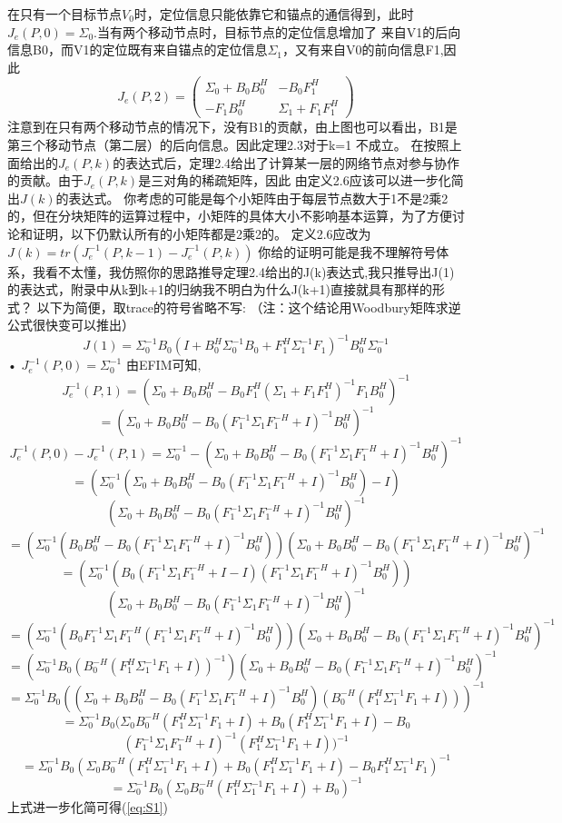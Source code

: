 \documentclass[12pt]{article}
\begin{document}
在只有一个目标节点$V_0$时，定位信息只能依靠它和锚点的通信得到，此时
$J_e(P,0)=\Sigma_0$.当有两个移动节点时，目标节点的定位信息增加了
来自V1的后向信息B0，而V1的定位既有来自锚点的定位信息$\Sigma_1$，又有来自V0的前向信息F1,因此
\[
J_e(P,2)=\left(
\begin{array}{cc}
\Sigma_0+B_0 B_0^H & -B_0 F_1^H\\
-F_1 B_0^H & \Sigma_1+F_1 F_1^H
\end{array}
\right)
\]
注意到在只有两个移动节点的情况下，没有B1的贡献，由上图也可以看出，B1是第三个移动节点（第二层）的后向信息。因此定理2.3对于k=1
不成立。
在按照上面给出的$J_e(P,k)$的表达式后，定理2.4给出了计算某一层的网络节点对参与协作的贡献。由于$J_e(P,k)$是三对角的稀疏矩阵，因此
由定义2.6应该可以进一步化简出$J(k)$的表达式。
你考虑的可能是每个小矩阵由于每层节点数大于1不是2乘2的，但在分块矩阵的运算过程中，小矩阵的具体大小不影响基本运算，为了方便讨论和证明，以下仍默认所有的小矩阵都是2乘2的。
定义2.6应改为$J(k)=tr(J^{-1}_e(P,k-1)-J^{-1}_e(P,k))$
你给的证明可能是我不理解符号体系，我看不太懂，我仿照你的思路推导定理2.4给出的J(k)表达式,我只推导出J(1)的表达式，附录中从k到k+1的归纳我不明白为什么J(k+1)直接就具有那样的形式？
以下为简便，取trace的符号省略不写:
（注：这个结论用Woodbury矩阵求逆公式很快变可以推出）
\begin{equation}\label{eq:S1}
J(1)=\Sigma_0^{-1} B_0 (I+B_0^H \Sigma_0^{-1} B_0+F_1^H \Sigma_1^{-1} F_1 )^{-1} B_0^H \Sigma_0^{-1}
\end{equation}•
$J_e^{-1}(P,0)=\Sigma_0^{-1}$
由EFIM可知,
\[
J_e^{-1}(P,1)=(\Sigma_0+B_0B_0^H-B_0F_1^H(\Sigma_1+F_1F_1^H)^{-1}F_1B_0^H)^{-1}
\]
\[
=(\Sigma_0+B_0B_0^H-B_0(F_1^{-1}\Sigma_1F_1^{-H}+I)^{-1}B_0^H)^{-1}
\]
\[
J_e^{-1}(P,0)-J_e^{-1}(P,1)
=\Sigma_0^{-1}-(\Sigma_0+B_0B_0^H-B_0(F_1^{-1}\Sigma_1F_1^{-H}+I)^{-1}B_0^H)^{-1}
\]
\[
=(\Sigma_0^{-1}(\Sigma_0+B_0B_0^H-B_0(F_1^{-1}\Sigma_1F_1^{-H}+I)^{-1}B_0^H)-I)
\]
\[
(\Sigma_0+B_0B_0^H-B_0(F_1^{-1}\Sigma_1F_1^{-H}+I)^{-1}B_0^H)^{-1}
\]
\[
=(\Sigma_0^{-1}(B_0B_0^H-B_0(F_1^{-1}\Sigma_1F_1^{-H}+I)^{-1}B_0^H))(\Sigma_0+B_0B_0^H-B_0(F_1^{-1}\Sigma_1F_1^{-H}+I)^{-1}B_0^H)^{-1}
\]
\[
=(\Sigma_0^{-1}(B_0(F_1^{-1}\Sigma_1F_1^{-H}+I-I)(F_1^{-1}\Sigma_1F_1^{-H}+I)^{-1}B_0^H))
\]
\[
(\Sigma_0+B_0B_0^H-B_0(F_1^{-1}\Sigma_1F_1^{-H}+I)^{-1}B_0^H)^{-1}
\]
\[
=(\Sigma_0^{-1}(B_0F_1^{-1}\Sigma_1F_1^{-H}(F_1^{-1}\Sigma_1F_1^{-H}+I)^{-1}B_0^H))(\Sigma_0+B_0B_0^H-B_0(F_1^{-1}\Sigma_1F_1^{-H}+I)^{-1}B_0^H)^{-1}
\]
\[
=(\Sigma_0^{-1}B_0(B_0^{-H}(F_1^H\Sigma_1^{-1}F_1+I))^{-1})(\Sigma_0+B_0B_0^H-B_0(F_1^{-1}\Sigma_1F_1^{-H}+I)^{-1}B_0^H)^{-1}
\]
\[
=\Sigma_0^{-1}B_0((\Sigma_0+B_0B_0^H-B_0(F_1^{-1}\Sigma_1F_1^{-H}+I)^{-1}B_0^H) (B_0^{-H}(F_1^H\Sigma_1^{-1}F_1+I)))^{-1}
\]
\[
=\Sigma_0^{-1}B_0(\Sigma_0 B_0^{-H}(F_1^H\Sigma_1^{-1}F_1+I)+B_0(F_1^H\Sigma_1^{-1}F_1+I)-B_0
\]
\[
(F_1^{-1}\Sigma_1F_1^{-H}+I)^{-1}(F_1^H\Sigma_1^{-1}F_1+I))^{-1}
\]
\[
=\Sigma_0^{-1}B_0(\Sigma_0 B_0^{-H}(F_1^H\Sigma_1^{-1}F_1+I)+B_0(F_1^H\Sigma_1^{-1}F_1+I)-B_0F_1^H\Sigma_1^{-1}F_1)^{-1}
\]
\[
=\Sigma_0^{-1}B_0(\Sigma_0 B_0^{-H}(F_1^H\Sigma_1^{-1}F_1+I)+B_0)^{-1}
\]
上式进一步化简可得(\ref{eq:S1})
\end{document}
